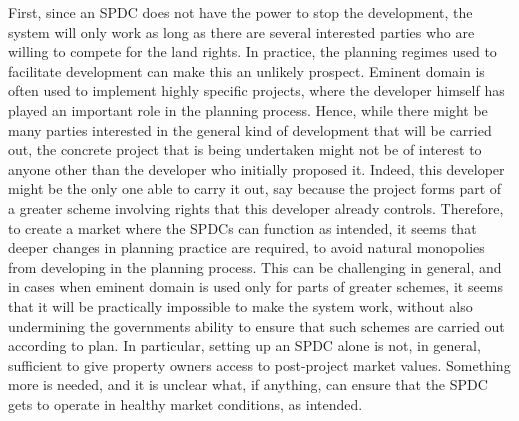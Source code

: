 First, since an SPDC does not have the power to stop the development, the system will only work as long as there are several interested parties who are willing to compete for the land rights. In practice, the planning regimes used to facilitate development can make this an unlikely prospect. Eminent domain is often used to implement highly specific projects, where the developer himself has played an important role in the planning process. Hence, while there might be many parties interested in the general kind of development that will be carried out, the concrete project that is being undertaken might not be of interest to anyone other than the developer who initially proposed it. Indeed, this developer might be the only one able to carry it out, say because the project forms part of a greater scheme involving rights that this developer already controls. Therefore, to create a market where the SPDCs can function as intended, it seems that deeper changes in planning practice are required, to avoid natural monopolies from developing in the planning process. This can be challenging in general, and in cases when eminent domain is used only for parts of greater schemes, it seems that it will be practically impossible to make the system work, without also undermining the governments ability to ensure that such schemes are carried out according to plan. In particular, setting up an SPDC alone is not, in general, sufficient to give property owners access to post-project market values. Something more is needed, and it is unclear what, if anything, can ensure that the SPDC gets to operate in healthy market conditions, as intended.

